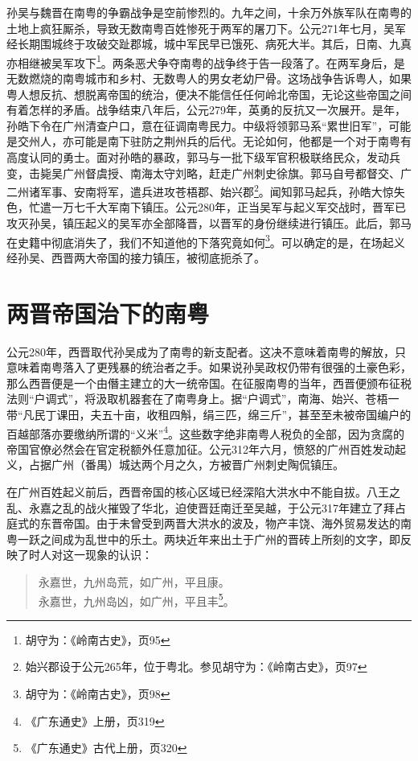 孙吴与魏晋在南粤的争霸战争是空前惨烈的。九年之间，十余万外族军队在南粤的土地上疯狂厮杀，导致无数南粤百姓惨死于两军的屠刀下。公元271年七月，吴军经长期围城终于攻破交趾郡城，城中军民早已饿死、病死大半。其后，日南、九真亦相继被吴军攻下\footnote{胡守为：《岭南古史》，页95}。两条恶犬争夺南粤的战争终于告一段落了。在两军身后，是无数燃烧的南粤城市和乡村、无数粤人的男女老幼尸骨。这场战争告诉粤人，如果粤人想反抗、想脱离帝国的统治，便决不能信任任何岭北帝国，无论这些帝国之间有着怎样的矛盾。战争结束八年后，公元279年，英勇的反抗又一次展开。是年，孙皓下令在广州清查户口，意在征调南粤民力。中级将领郭马系“累世旧军”，可能是交州人，亦可能是南下驻防之荆州兵的后代。无论如何，他都是一个对于南粤有高度认同的勇士。面对孙皓的暴政，郭马与一批下级军官积极联络民众，发动兵变，击毙吴广州督虞授、南海太守刘略，赶走广州刺史徐旗。郭马自号都督交、广二州诸军事、安南将军，遣兵进攻苍梧郡、始兴郡\footnote{始兴郡设于公元265年，位于粤北。参见胡守为：《岭南古史》，页97}。闻知郭马起兵，孙皓大惊失色，忙遣一万七千大军南下镇压。公元280年，正当吴军与起义军交战时，晋军已攻灭孙吴，镇压起义的吴军亦全部降晋，以晋军的身份继续进行镇压。此后，郭马在史籍中彻底消失了，我们不知道他的下落究竟如何\footnote{胡守为：《岭南古史》，页98}。可以确定的是，在场起义经孙吴、西晋两大帝国的接力镇压，被彻底扼杀了。

\section{两晋帝国治下的南粤}

公元280年，西晋取代孙吴成为了南粤的新支配者。这决不意味着南粤的解放，只意味着南粤落入了更残暴的统治者之手。如果说孙吴政权仍带有很强的土豪色彩，那么西晋便是一个由僭主建立的大一统帝国。在征服南粤的当年，西晋便颁布征税法则“户调式”，将汲取机器套在了南粤身上。据“户调式”，南海、始兴、苍梧一带“凡民丁课田，夫五十亩，收租四斛，绢三匹，绵三斤”，甚至至未被帝国编户的百越部落亦要缴纳所谓的“义米”\footnote{《广东通史》上册，页319}。这些数字绝非南粤人税负的全部，因为贪腐的帝国官僚必然会在官定税额外任意加征。公元312年六月，愤怒的广州百姓发动起义，占据广州（番禺）城达两个月之久，方被晋广州刺史陶侃镇压。

在广州百姓起义前后，西晋帝国的核心区域已经深陷大洪水中不能自拔。八王之乱、永嘉之乱的战火摧毁了华北，迫使晋廷南迁至吴越，于公元317年建立了拜占庭式的东晋帝国。由于未曾受到两晋大洪水的波及，物产丰饶、海外贸易发达的南粤一跃之间成为乱世中的乐土。两块近年来出土于广州的晋砖上所刻的文字，即反映了时人对这一现象的认识：

\begin{quote}
	永嘉世，九州岛荒，如广州，平且康。\\
	永嘉世，九州岛凶，如广州，平且丰\footnote{《广东通史》古代上册，页320}。
\end{quote}

